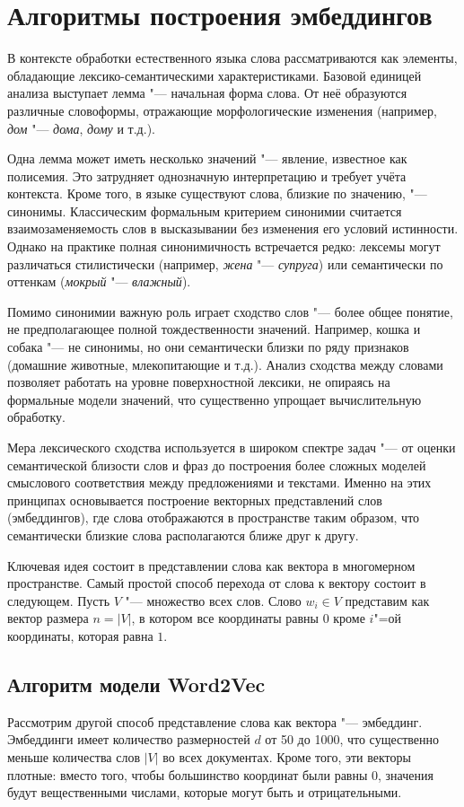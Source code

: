 \documentclass[coursework]{SCWorks}
\begin{document}
\section{Алгоритмы построения эмбеддингов}
В контексте обработки естественного языка слова рассматриваются как элементы, обладающие лексико-семантическими характеристиками. Базовой единицей анализа выступает лемма "--- начальная форма слова. От неё образуются различные словоформы, отражающие морфологические изменения (например, \textit{дом} "--- \textit{дома}, \textit{дому} и т.д.).

Одна лемма может иметь несколько значений "--- явление, известное как полисемия. Это затрудняет однозначную интерпретацию и требует учёта контекста. Кроме того, в языке существуют слова, близкие по значению, "--- синонимы. Классическим формальным критерием синонимии считается взаимозаменяемость слов в высказывании без изменения его условий истинности. Однако на практике полная синонимичность встречается редко: лексемы могут различаться стилистически (например, \textit{жена} "--- \textit{супруга}) или семантически по оттенкам (\textit{мокрый} "--- \textit{влажный}).

Помимо синонимии важную роль играет сходство слов "--- более общее понятие, не предполагающее полной тождественности значений. Например, кошка и собака "--- не синонимы, но они семантически близки по ряду признаков (домашние животные, млекопитающие и т.д.). Анализ сходства между словами позволяет работать на уровне поверхностной лексики, не опираясь на формальные модели значений, что существенно упрощает вычислительную обработку.

Мера лексического сходства используется в широком спектре задач "--- от оценки семантической близости слов и фраз до построения более сложных моделей смыслового соответствия между предложениями и текстами. Именно на этих принципах основывается построение векторных представлений слов (эмбеддингов), где слова отображаются в пространстве таким образом, что семантически близкие слова располагаются ближе друг к другу.

Ключевая идея состоит в представлении слова как вектора в многомерном пространстве. Самый простой способ перехода от слова к вектору состоит в следующем. Пусть $V$ "--- множество всех слов. Слово $w_i \in V$ представим как вектор размера $n = |V|$, в котором все координаты равны $0$ кроме $i$"=ой координаты, которая равна $1$.

\subsection{Алгоритм модели Word2Vec}
Рассмотрим другой способ представление слова как вектора "--- эмбеддинг. Эмбеддинги имеет количество размерностей $d$ от 50 до 1000, что существенно меньше количества слов $|V|$ во всех документах. Кроме того, эти векторы плотные: вместо того, чтобы большинство координат были равны 0, значения будут вещественными числами, которые могут быть и отрицательными.
\end{document}
